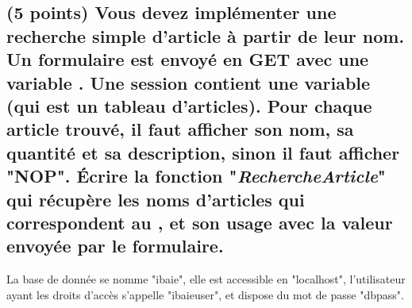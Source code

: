 \documentclass[11pt,a4paper]{article}
\begin{document}
\begin{center}

\LigneReponseDix

\medskip

\LigneReponseCinq

\medskip

\LigneReponse

\medskip

\LigneReponse

\medskip

\LigneReponse

\medskip

\LigneReponse

\end{center}



\newpage


\begin{center}

\LigneReponseQuarante

\end{center}


\newpage

\subsection{(5 points) Vous devez implémenter une recherche simple d'article à partir de leur nom. Un formulaire est envoyé en GET avec une variable . Une session contient une variable  (qui est un tableau d'articles). Pour chaque article trouvé, il faut afficher son nom, sa quantité et sa description, sinon il faut afficher "NOP". \'Ecrire la fonction "\textit{RechercheArticle}" qui récupère les noms d'articles qui correspondent au , et son usage avec la valeur envoyée par le formulaire.}

\medskip

\begin{WhiteBox}
La base de donnée se nomme "ibaie", elle est accessible en "localhost", l'utilisateur ayant les droits d'accès s'appelle "ibaieuser", et dispose du mot de passe "dbpass".
\end{WhiteBox}

\medskip

\renewcommand\arraystretch{2.5}
\end{document}
